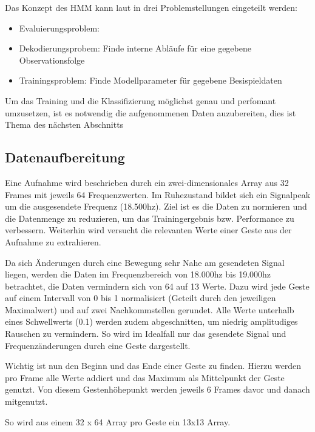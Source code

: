 Das Konzept des \acl{HMM} kann laut \cite{rabiner} in drei Problemstellungen eingeteilt werden:
\begin{itemize}
  \item Evaluierungsproblem: 
  \item Dekodierungsprobem: Finde interne Abläufe für eine gegebene Observationsfolge
  \item Trainingsproblem: Finde Modellparameter für gegebene Besispieldaten
\end{itemize}




Um das Training und die Klassifizierung möglichst genau und perfomant umzusetzen, 
ist es notwendig die aufgenommenen Daten auzubereiten, dies ist Thema des nächsten Abschnitts


\subsection{Datenaufbereitung} \label{sec:preproc}
Eine Aufnahme wird beschrieben durch ein zwei-dimensionales Array aus 32 Frames mit jeweils 64 Frequenzwerten.
Im Ruhezustand bildet sich ein Signalpeak um die ausgesendete Frequenz (18.500hz).
Ziel ist es die Daten zu normieren und die Datenmenge zu reduzieren, um das Trainingergebnis bzw. Performance zu verbessern.
Weiterhin wird versucht die relevanten Werte einer Geste aus der Aufnahme zu extrahieren.

Da sich Änderungen durch eine Bewegung sehr Nahe am gesendeten Signal liegen, werden die Daten im 
Frequenzbereich von 18.000hz bis 19.000hz betrachtet, die Daten vermindern sich von 64 auf 13 Werte. 
Dazu wird jede Geste auf einem Intervall von 0 bis 1 normalisiert (Geteilt durch den jeweiligen Maximalwert) und 
auf zwei Nachkommstellen gerundet. 
Alle Werte unterhalb eines Schwellwerts (0.1) werden zudem abgeschnitten, um niedrig amplitudiges Rauschen zu vermindern. 
So wird im Idealfall nur das gesendete Signal und Frequenzänderungen durch eine Geste dargestellt.

Wichtig ist nun den Beginn und das Ende einer Geste zu finden. Hierzu werden pro Frame alle Werte addiert 
und das Maximum als Mittelpunkt der Geste genutzt. Von diesem Gestenhöhepunkt werden jeweils 6 Frames davor und danach mitgenutzt.

So wird aus einem 32 x 64 Array pro Geste ein 13x13 Array.


